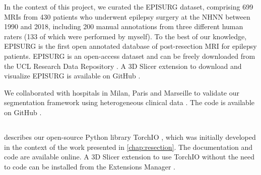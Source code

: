 In the context of this project, we curated the EPISURG dataset, comprising 699 \acp{MRI} from 430 patients who underwent epilepsy surgery at the \ac{NHNN} between 1990 and 2018, including 200 manual annotations from three different human raters (133 of which were performed by myself).
To the best of our knowledge, EPISURG is the first open annotated database of post-resection \ac{MRI} for epilepsy patients.
EPISURG is an open-access dataset and can be freely downloaded from the UCL Research Data Repository \cite{perez-garcia_episurg_2020}.
A 3D Slicer extension to download and visualize EPISURG is available on GitHub%
.

We collaborated with hospitals in Milan, Paris and Marseille to validate our segmentation framework using heterogeneous clinical data \cite{perez-garcia_self-supervised_2021}.
The code is available on GitHub%
.


\subsection{}

 describes our open-source Python library TorchIO \cite{perez-garcia_torchio_2021}, which was initially developed in the context of the work presented in \cref{chap:resection}.
The documentation%
and code%
are available online.
A 3D Slicer extension to use TorchIO without the need to code can be installed from the Extensions Manager%
.

